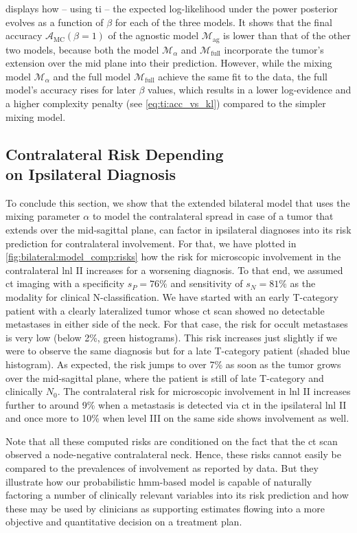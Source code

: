 \documentclass[\relativeRoot/main.tex]{subfiles}
\begin{document}
 displays how -- using \gls{ti} -- the expected log-likelihood under the power posterior evolves as a function of $\beta$ for each of the three models. It shows that the final accuracy $\mathcal{A}_\text{MC}(\beta=1)$ of the agnostic model $\mathcal{M}_\text{ag}$ is lower than that of the other two models, because both the model $\mathcal{M}_\alpha$ and $\mathcal{M}_\text{full}$ incorporate the tumor's extension over the mid plane into their prediction. However, while the mixing model $\mathcal{M}_\alpha$ and the full model $\mathcal{M}_\text{full}$ achieve the same fit to the data, the full model's accuracy rises for later $\beta$ values, which results in a lower log-evidence and a higher complexity penalty (see \cref{eq:ti:acc_vs_kl}) compared to the simpler mixing model.

\subsection[Contralateral Risk Depending on Ipsilateral Diagnosis]{Contralateral Risk Depending\\on Ipsilateral Diagnosis}
\label{subsec:bilateral:model_comp:risk}

To conclude this section, we show that the extended bilateral model that uses the mixing parameter $\alpha$ to model the contralateral spread in case of a tumor that extends over the mid-sagittal plane, can factor in ipsilateral diagnoses into its risk prediction for contralateral involvement. For that, we have plotted in \cref{fig:bilateral:model_comp:risks} how the risk for microscopic involvement in the contralateral \gls{lnl} II increases for a worsening diagnosis. To that end, we assumed \gls{ct} imaging with a specificity $s_P = 76\%$ and sensitivity of $s_N = 81\%$ as the modality for clinical N-classification. We have started with an early T-category patient with a clearly lateralized tumor whose \gls{ct} scan showed no detectable metastases in either side of the neck. For that case, the risk for occult metastases is very low (below 2\%, green histograms). This risk increases just slightly if we were to observe the same diagnosis but for a late T-category patient (shaded blue histogram). As expected, the risk jumps to over 7\% as soon as the tumor grows over the mid-sagittal plane, where the patient is still of late T-category and clinically $N_0$. The contralateral risk for microscopic involvement in \gls{lnl} II increases further to around 9\% when a metastasis is detected via \gls{ct} in the ipsilateral \gls{lnl} II and once more to 10\% when level III on the same side shows involvement as well.

Note that all these computed risks are conditioned on the fact that the \gls{ct} scan observed a node-negative contralateral neck. Hence, these risks cannot easily be compared to the prevalences of involvement as reported by data. But they illustrate how our probabilistic \acrshort{hmm}-based model is capable of naturally factoring a number of clinically relevant variables into its risk prediction and how these may be used by clinicians as supporting estimates flowing into a more objective and quantitative decision on a treatment plan.
\end{document}
